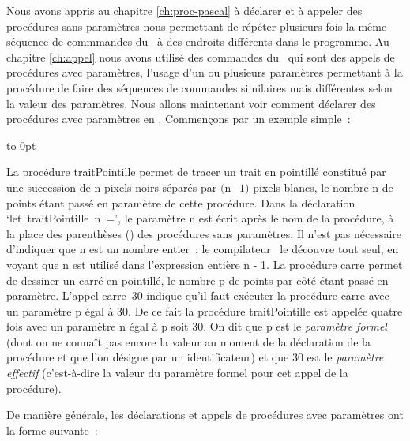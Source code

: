 Nous avons appris au chapitre \ref{ch:proc-pascal} à déclarer et à appeler des procédures sans paramètres
nous permettant de répéter plusieurs fois la même séquence de commmandes du
\robot\ à des endroits différents dans le programme. Au chapitre \ref{ch:appel} nous avons
utilisé des commandes du \robot\ qui sont des appels de procédures avec paramètres,
l'usage d'un ou plusieurs paramètres per\-met\-tant à la procédure de faire des séquences
de commandes similaires mais différentes selon la valeur des paramètres. Nous allons maintenant
voir comment déclarer des procédures avec paramètres en \ocaml. Commençons
par un exemple simple~:

\bigskip

 {\raggedright 
 {}\hfill\vbox to 0pt{\vspace*{\baselineskip}\vspace*{3cm}
 }\hspace*{30mm}%
 \label{prog:CarrePointille}
 
 }
La procédure {\idt traitPointille} permet de tracer un trait en pointillé cons\-ti\-tué par une succession de
{\idt n} pixels noirs séparés par $(${\idt n}$ - 1)$ pixels blancs, le nom\-bre {\idt n} de points étant
passé en paramètre de cette procédure. Dans la déclaration `{\mcl let}\ {\idt traitPointille\ n\ =}',
le paramètre {\idt n} est écrit après le nom de la procédure, à la place des parenthèses
{\idt ()} des procédures sans paramètres. Il n'est pas nécessaire d'indiquer que {\idt n} est
un nombre entier~: le compilateur \ocaml\ le découvre tout seul, en voyant que {\idt n}
est utilisé dans l'expression entière {\idt n - 1}.
La procédure {\idt carre} permet de dessiner un carré
en pointillé, le nombre {\idt p} de points par côté étant passé en paramètre. L'appel {\idt carre\ 30}
indique qu'il faut exécuter la procédure {\idt carre} avec un paramètre {\idt p} égal à 30. De ce fait la
procédure {\idt traitPointille} est appelée quatre fois avec un paramètre {\idt n} égal à {\idt p} soit
30. On dit que {\idt p} est le {\em paramètre formel}  (dont on ne connaît pas encore la valeur
au moment de la déclaration de la procédure et que l'on désigne par un identificateur) et que 
30 est le {\em paramètre effectif} (c'est-à-dire
la valeur du paramètre formel pour cet appel de la procédure).

De manière générale, les déclarations et appels de procédures avec pa\-ra\-mè\-tres ont  la forme
suivante~:

